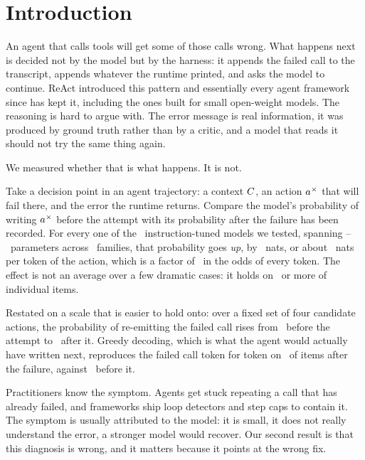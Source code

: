 \section{Introduction}
\label{sec:intro}

An agent that calls tools will get some of those calls wrong. What happens next
is decided not by the model but by the harness: it appends the failed call to
the transcript, appends whatever the runtime printed, and asks the model to
continue. ReAct \citep{yao2023react} introduced this pattern and essentially
every agent framework since has kept it, including the ones built for
small open-weight models. The reasoning is hard to argue with. The error message
is real information, it was produced by ground truth rather than by a critic,
and a model that reads it should not try the same thing again.

We measured whether that is what happens. It is not.

Take a decision point in an agent trajectory: a context $C$, an action
$a^{\times}$ that will fail there, and the error the runtime returns. Compare the
model's probability of writing $a^{\times}$ before the attempt with its probability
after the failure has been recorded. For every one of the
\NumModelsToolshed\ instruction-tuned models we tested, spanning
\SmallestModel--\LargestModel\ parameters across \NumFamilies\ families, that
probability goes \emph{up}, by \MeanG\ nats, or about \GPerTokenTool\ nats per
token of the action, which is a factor of \OddsPerToken\ in the odds of every
token. The effect is not an average over a few dramatic cases: it holds on
\FracNegTool\ or more of individual items.

Restated on a scale that is easier to hold onto: over a fixed set of four
candidate actions, the probability of re-emitting the failed call rises from
\PRepeatPreMean\ before the attempt to \PRepeatPostMean\ after it. Greedy
decoding, which is what the agent would actually have written next, reproduces
the failed call token for token on \GreedyPostMean\ of items after the failure,
against \GreedyPreMean\ before it.

Practitioners know the symptom. Agents get stuck repeating a call that has
already failed, and frameworks ship loop detectors and step caps to contain it.
The symptom is usually attributed to the model: it is small, it does not really
understand the error, a stronger model would recover. Our second result is that
this diagnosis is wrong, and it matters because it points at the wrong fix.

